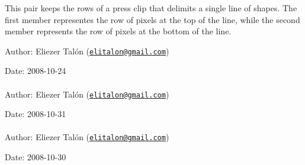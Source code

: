 This pair keeps the rows of a press clip that delimits a single line of shapes. The first member representes the row of pixels at the top of the line, while the second member represents the row of pixels at the bottom of the line.

\begin{Desc}
\item[Author:]Eliezer Talón (\href{mailto:elitalon@gmail.com}{\tt elitalon@gmail.com}) \end{Desc}
\begin{Desc}
\item[Date:]2008-10-24 \end{Desc}
\hypertarget{class_segmenter_b3190459e52101e495e49e936bbb6440}{
\paragraph[LineMarkerIterator]{}\hfill}
\label{class_segmenter_b3190459e52101e495e49e936bbb6440}


\begin{Desc}
\item[Author:]Eliezer Talón (\href{mailto:elitalon@gmail.com}{\tt elitalon@gmail.com}) \end{Desc}
\begin{Desc}
\item[Date:]2008-10-31 \end{Desc}
\hypertarget{class_segmenter_1190be7ec081a96ee2ae91e0bb256a0d}{
\paragraph[ShapeIterator]{}\hfill}
\label{class_segmenter_1190be7ec081a96ee2ae91e0bb256a0d}


\begin{Desc}
\item[Author:]Eliezer Talón (\href{mailto:elitalon@gmail.com}{\tt elitalon@gmail.com}) \end{Desc}
\begin{Desc}
\item[Date:]2008-10-30 \end{Desc}


